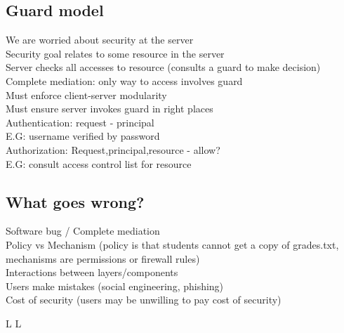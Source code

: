 \subsection{Guard model}
We are worried about security at the server\\
Security goal relates to some resource in the server\\
Server checks all accesses to resource (consults a guard to make decision)\\
Complete mediation: only way to access involves guard\\
Must enforce client-server modularity\\
Must ensure server invokes guard in right places\\
Authentication: request - principal\\
E.G: username verified by password\\
Authorization: Request,principal,resource - allow?\\
E.G: consult access control list for resource
\subsection{What goes wrong?}
Software bug / Complete mediation\\
Policy vs Mechanism (policy is that students cannot get a copy of grades.txt, mechanisms are permissions or firewall rules)\\
Interactions between layers/components\\
Users make mistakes (social engineering, phishing)\\
Cost of security (users may be unwilling to pay cost of security)



\vfill \smallskip
\supereject
\if L\lr \else\null\vfill\eject\fi
\if L\lr \else\null\vfill\eject\fi
\bye


